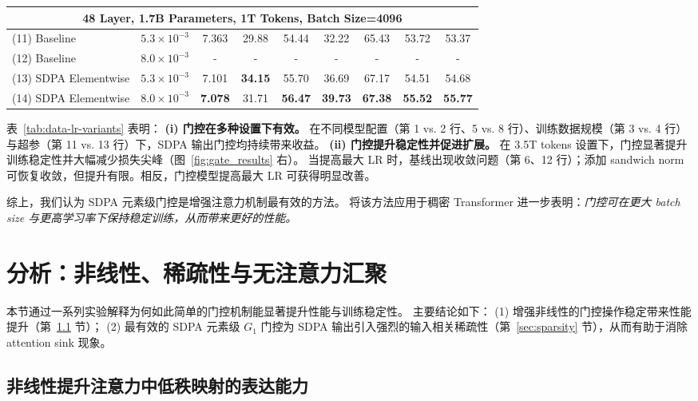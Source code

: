 \documentclass{article} %
\begin{document}
\begin{table}[t!]
{\begin{tabular}{lc|ccccccc}
\midrule
\multicolumn{9}{c}{48 Layer, 1.7B Parameters, \textbf{1T Tokens}, Batch Size=4096} \\
\midrule
(11) Baseline & $5.3 \times 10^{-3}$ & 7.363 & 29.88 & 54.44 & 32.22 & 65.43 & 53.72 & 53.37 \\
(12) Baseline & $8.0 \times 10^{-3}$ & - & - & - & - & - & - & - \\
(13) SDPA Elementwise & $5.3 \times 10^{-3}$ & 7.101 & \textbf{34.15} & 55.70 & 36.69 & 67.17 & 54.51 & 54.68 \\
(14) SDPA Elementwise & $8.0 \times 10^{-3}$ & \textbf{7.078} & 31.71 & \textbf{56.47} & \textbf{39.73} & \textbf{67.38} & \textbf{55.52} & \textbf{55.77} \\
\bottomrule
\end{tabular}
}
\end{table}


表~\ref{tab:data-lr-variants} 表明：
\textbf{(i) 门控在多种设置下有效。} 在不同模型配置（第 1 vs. 2 行、5 vs. 8 行）、训练数据规模（第 3 vs. 4 行）与超参（第 11 vs. 13 行）下，SDPA 输出门控均持续带来收益。
\textbf{(ii) 门控提升稳定性并促进扩展。} 在 3.5T tokens 设置下，门控显著提升训练稳定性并大幅减少损失尖峰（图~\ref{fig:gate_results} 右）。
当提高最大 LR 时，基线出现收敛问题（第 6、12 行）；添加 sandwich norm~\citep{ding2021cogview} 可恢复收敛，但提升有限。相反，门控模型提高最大 LR 可获得明显改善。

综上，我们认为 SDPA 元素级门控是增强注意力机制最有效的方法。
将该方法应用于稠密 Transformer 进一步表明：\textit{门控可在更大 batch size 与更高学习率下保持稳定训练，从而带来更好的性能。}


\section{分析：非线性、稀疏性与无注意力汇聚}

本节通过一系列实验解释为何如此简单的门控机制能显著提升性能与训练稳定性。
主要结论如下：
(1) 增强非线性的门控操作稳定带来性能提升（第~\ref{sec:non-linearity} 节）；
(2) 最有效的 SDPA 元素级 $G_1$ 门控为 SDPA 输出引入强烈的输入相关稀疏性（第~\ref{sec:sparsity} 节），从而有助于消除 attention sink 现象。

\subsection{非线性提升注意力中低秩映射的表达能力}
\label{sec:non-linearity}
\end{document}
